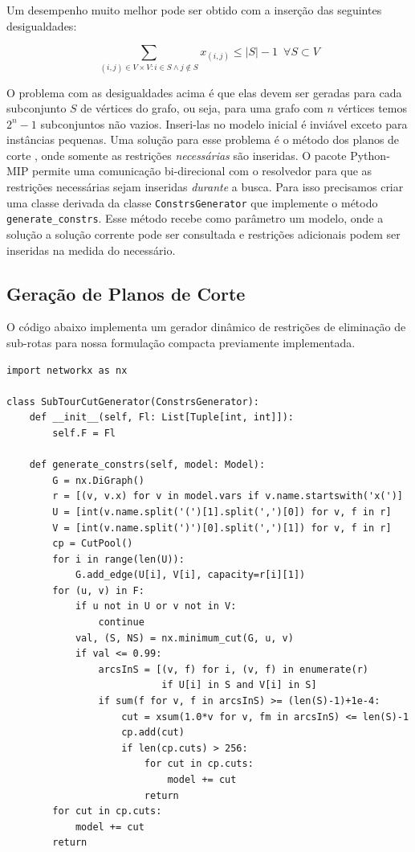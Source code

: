 \documentclass[a4paper,11pt,fleqn]{article}
\begin{document}
Um desempenho muito melhor pode ser obtido com a inserção das seguintes desigualdades:

\begin{equation}
\sum_{(i,j) \in V \times V : i\in S \land j \notin S} x_{(i,j)} \leq |S|-1 \,\,\, \forall S \subset V 
\end{equation}

O problema com as desigualdades acima é que elas devem ser geradas para cada subconjunto $S$ de vértices do grafo, ou seja, para uma grafo com $n$ vértices temos $2^n-1$ subconjuntos não vazios. Inseri-las no modelo inicial é inviável exceto para instâncias pequenas. Uma solução para esse problema é o método dos planos de corte \citep{Dantzig54}, onde somente as restrições \emph{necessárias} são inseridas. O pacote Python-MIP permite uma comunicação bi-direcional com o resolvedor para que as restrições necessárias sejam inseridas \emph{durante} a busca. Para isso precisamos criar uma classe derivada da classe \texttt{ConstrsGenerator} que implemente o método \texttt{generate\_constrs}. Esse método recebe como parâmetro um modelo, onde a solução a solução corrente pode ser consultada e restrições adicionais podem ser inseridas na medida do necessário. 

\subsection{Geração de Planos de Corte}

O código abaixo implementa um gerador dinâmico de restrições de eliminação de sub-rotas para nossa formulação compacta previamente implementada. 

{\small
\begin{lstlisting}
import networkx as nx

class SubTourCutGenerator(ConstrsGenerator):
    def __init__(self, Fl: List[Tuple[int, int]]):
        self.F = Fl

    def generate_constrs(self, model: Model):
        G = nx.DiGraph()
        r = [(v, v.x) for v in model.vars if v.name.startswith('x(')]
        U = [int(v.name.split('(')[1].split(',')[0]) for v, f in r]
        V = [int(v.name.split(')')[0].split(',')[1]) for v, f in r]
        cp = CutPool()
        for i in range(len(U)):
            G.add_edge(U[i], V[i], capacity=r[i][1])
        for (u, v) in F:
            if u not in U or v not in V:
                continue
            val, (S, NS) = nx.minimum_cut(G, u, v)
            if val <= 0.99:
                arcsInS = [(v, f) for i, (v, f) in enumerate(r)
                           if U[i] in S and V[i] in S]
                if sum(f for v, f in arcsInS) >= (len(S)-1)+1e-4:
                    cut = xsum(1.0*v for v, fm in arcsInS) <= len(S)-1
                    cp.add(cut)
                    if len(cp.cuts) > 256:
                        for cut in cp.cuts:
                            model += cut
                        return
        for cut in cp.cuts:
            model += cut
        return
\end{lstlisting}}
\end{document}
